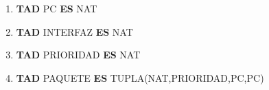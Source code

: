 \documentclass[a4paper,spanish, 10pt]{article}
\begin{document}
\pagestyle{fancy}
\thispagestyle{fancy}
\addtolength{\headheight}{1pt}
\cfoot{\thepage /\pageref{LastPage}}
\renewcommand{\footrulewidth}{0.4pt}

\author{Algoritmos y Estructuras de Datos II, DC, UBA.}
\date{}
\title{}





 	\begin{enumerate}
 	    \item \textbf{TAD} PC \textbf{ES} NAT
	    \item \textbf{TAD} INTERFAZ \textbf{ES} NAT
	    \item \textbf{TAD} PRIORIDAD \textbf{ES} NAT
	    \item \textbf{TAD} PAQUETE \textbf{ES} TUPLA(NAT,PRIORIDAD,PC,PC)
	\end{enumerate}
%
%
%

\end{document}
